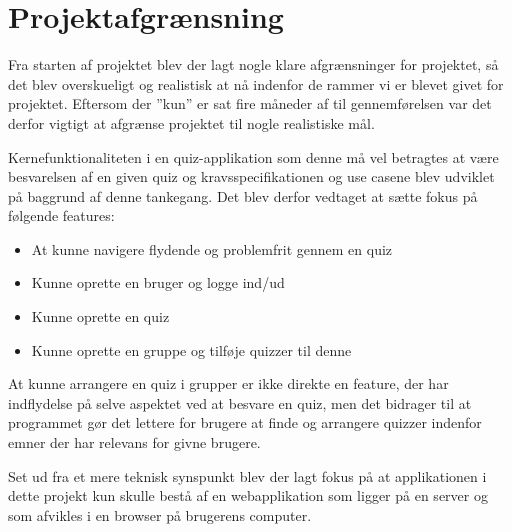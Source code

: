\chapter{Projektafgrænsning}

Fra starten af projektet blev der lagt nogle klare afgrænsninger for projektet, så det blev overskueligt og realistisk at nå indenfor de rammer vi er blevet givet for projektet. Eftersom der ''kun'' er sat fire måneder af til gennemførelsen var det derfor vigtigt at afgrænse projektet til nogle realistiske mål.

Kernefunktionaliteten i en quiz-applikation som denne må vel betragtes at være besvarelsen af en given quiz og kravsspecifikationen og use casene blev udviklet på baggrund af denne tankegang. Det blev derfor vedtaget at sætte fokus på følgende features:

\begin{itemize}
\item At kunne navigere flydende og problemfrit gennem en quiz
\item Kunne oprette en bruger og logge ind/ud
\item Kunne oprette en quiz
\item Kunne oprette en gruppe og tilføje quizzer til denne
\end{itemize}

At kunne arrangere en quiz i grupper er ikke direkte en feature, der har indflydelse på selve aspektet ved at besvare en quiz, men det bidrager til at programmet gør det lettere for brugere at finde og arrangere quizzer indenfor emner der har relevans for givne brugere.

Set ud fra et mere teknisk synspunkt blev der lagt fokus på  at  applikationen i dette projekt kun skulle bestå af en webapplikation som ligger på en server og som afvikles i en browser på brugerens computer.

